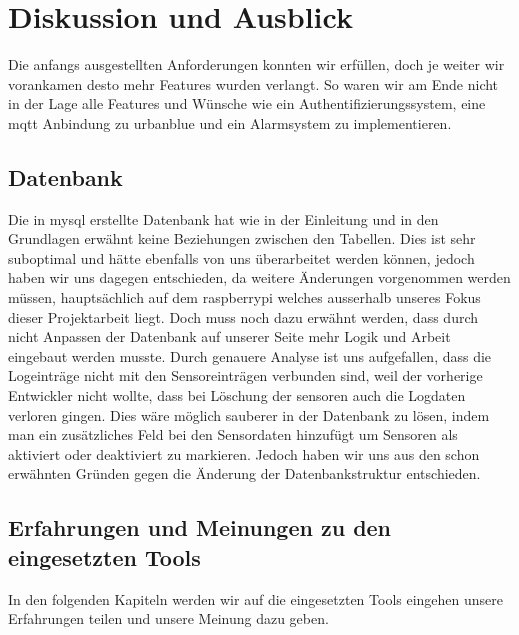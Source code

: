 \documentclass[../main.tex]{subfiles}
\begin{document}
	\section{Diskussion und Ausblick}
	Die anfangs ausgestellten Anforderungen konnten wir erfüllen, doch je weiter wir vorankamen desto mehr Features wurden verlangt. So waren wir am Ende nicht in der Lage alle Features und Wünsche wie ein Authentifizierungssystem, eine \gls{mqtt}\cite{MQTT} Anbindung zu \gls{urbanblue}\cite{Urbanblue} und ein Alarmsystem zu implementieren.\\
	\par
	\noindent

	\subsection{Datenbank}
	Die in \gls{mysql} erstellte Datenbank hat wie in der Einleitung und in den Grundlagen erwähnt keine Beziehungen zwischen den Tabellen. Dies ist sehr suboptimal und hätte ebenfalls von uns überarbeitet werden können, jedoch haben wir uns dagegen entschieden, da weitere Änderungen vorgenommen werden müssen, hauptsächlich auf dem \gls{raspberrypi} welches ausserhalb unseres Fokus dieser Projektarbeit liegt. Doch muss noch dazu erwähnt werden, dass durch nicht Anpassen der Datenbank auf unserer Seite mehr Logik und Arbeit eingebaut werden musste. Durch genauere Analyse ist uns aufgefallen, dass die Logeinträge nicht mit den Sensoreinträgen verbunden sind, weil der vorherige Entwickler nicht wollte, dass bei Löschung der \gls{sensor}en auch die Logdaten verloren gingen. Dies wäre möglich sauberer in der Datenbank zu lösen, indem man ein zusätzliches Feld bei den Sensordaten hinzufügt um Sensoren als aktiviert oder deaktiviert zu markieren. Jedoch haben wir uns aus den schon erwähnten Gründen gegen die Änderung der Datenbankstruktur entschieden.
	
	\subsection{Erfahrungen und Meinungen zu den eingesetzten Tools}
	In den folgenden Kapiteln werden wir auf die eingesetzten Tools eingehen unsere Erfahrungen teilen und unsere Meinung dazu geben.
	
\end{document}
